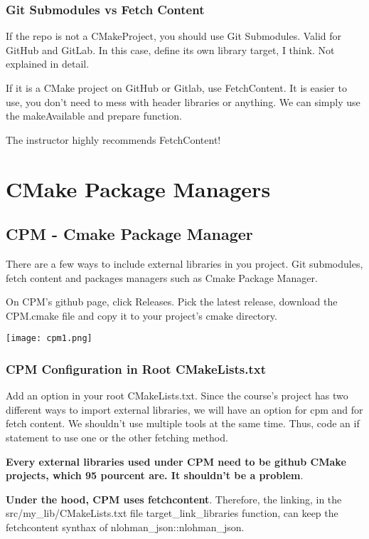 \documentclass[openany]{report}
\begin{document}
\subsection{Git Submodules vs Fetch Content}

If the repo is not a CMakeProject, you should use Git Submodules. Valid for GitHub and GitLab. In this case, 
define its own library target, I think. Not explained in detail.

If it is a CMake project on GitHub or Gitlab, use FetchContent. It is easier to use, you don't need to mess with header
libraries or anything. We can simply use the makeAvailable and prepare function.

The instructor highly recommends FetchContent!


\chapter{CMake Package Managers}

\section{CPM - Cmake Package Manager}

There are a few ways to include external libraries in you project. Git submodules, fetch content and packages managers such as
Cmake Package Manager.

On CPM's github page, click Releases. Pick the latest release, download the CPM.cmake file and copy it to your project's
cmake directory.

\begin{center}
    \texttt{[image: cpm1.png]}
\end{center}


\subsection{CPM Configuration in Root CMakeLists.txt}

Add an option in your root CMakeLists.txt.
Since the course's project has two different ways to import external libraries,
we will have an option for cpm and for fetch content.
We shouldn't use multiple tools at the same time. Thus, code
an if statement to use one or the other fetching method.

\textbf{Every external libraries used under CPM need to be github CMake projects, which 95 pourcent are.
It shouldn't be a problem}.


\textbf{Under the hood, CPM uses fetchcontent}. Therefore, the linking,
in the src/my\_lib/CMakeLists.txt file target\_link\_libraries function, 
can keep the fetchcontent synthax of nlohman\_json::nlohman\_json.
\end{document}
